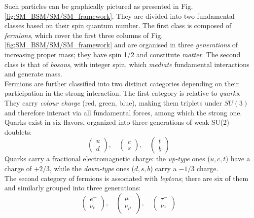 \noindent Such particles can be graphically pictured as presented in Fig. \ref{fig:SM_BSM/SM/SM_framework}. 
They are divided into two fundamental classes based on their spin quantum number. The first class is composed of \textit{fermions}, which cover the first three columns of Fig. \ref{fig:SM_BSM/SM/SM_framework} and are organised in three \textit{generations} of increasing proper mass; they have spin 1/2 and constitute \textit{matter}. The second class is that of \textit{bosons}, with integer spin, which \textit{mediate} fundamental interactions and generate mass.\\
Fermions are further classified into two distinct categories depending on their participation in the strong interaction. The first category is relative to \textit{quarks}. They carry \textit{colour charge} (red, green, blue), making them triplets under $SU(3)$ and therefore interact via all fundamental forces, among which the strong one.
Quarks exist in six flavors, organized into three generations of weak SU(2) doublets:
\begin{equation}\label{eq:SM_BSM/SM/quarks}
    \begin{pmatrix} u \\ d \end{pmatrix}, \quad 
    \begin{pmatrix} c \\ s \end{pmatrix}, \quad 
    \begin{pmatrix} t \\ b \end{pmatrix}
\end{equation}
Quarks carry a fractional electromagnetic charge: the \textit{up-type} ones ($u, c, t$) have a charge of $+2/3$, while the \textit{down-type} ones ($d, s, b$) carry a $-1/3$ charge.\\
The second category of fermions is associated with \textit{leptons}; there are six of them and similarly grouped into three generations:
\begin{equation}\label{eq:SM_BSM/SM/leptons}
    \begin{pmatrix} e^- \\ \nu_e \end{pmatrix}, \quad 
    \begin{pmatrix} \mu^- \\ \nu_\mu \end{pmatrix}, \quad 
    \begin{pmatrix} \tau^- \\ \nu_\tau \end{pmatrix}
\end{equation}
